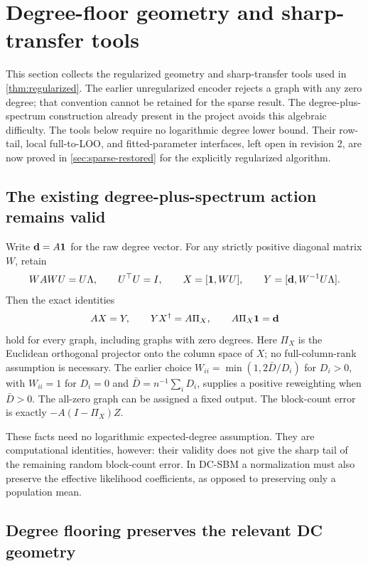 \section{Degree-floor geometry and sharp-transfer tools}
\label{sec:sparse-extension}

This section collects the regularized geometry and sharp-transfer tools
used in \cref{thm:regularized}. The earlier unregularized encoder
rejects a graph with any zero degree; that convention cannot be
retained for the sparse result. The degree-plus-spectrum construction
already present in the project avoids this algebraic difficulty.
The tools below require no logarithmic degree lower bound.
Their row-tail, local full-to-LOO, and fitted-parameter interfaces,
left open in revision 2, are now proved in
\cref{sec:sparse-restored} for the explicitly regularized algorithm.

\subsection{The existing degree-plus-spectrum action remains valid}

Write $\mathbf d=A\mathbf 1$ for the raw degree vector. For any strictly
positive diagonal matrix $W$, retain
\[
 WAWU=U\Lambda,\qquad U^\top U=I,\qquad
 X=[\mathbf 1,WU],\qquad Y=[\mathbf d,W^{-1}U\Lambda].
\]
Then the exact identities
\begin{equation}\label{eq:sparse-old-action}
 AX=Y,\qquad YX^\dagger=A\Pi_X,\qquad A\Pi_X\mathbf 1=\mathbf d
\end{equation}
hold for every graph, including graphs with zero degrees. Here $\Pi_X$
is the Euclidean orthogonal projector onto the column space of $X$;
no full-column-rank assumption is necessary. The earlier choice
$W_{ii}=\min(1,2\bar D/D_i)$ for $D_i>0$, with $W_{ii}=1$ for
$D_i=0$ and $\bar D=n^{-1}\sum_iD_i$, supplies a positive reweighting
when $\bar D>0$. The all-zero graph can be assigned a fixed output.
The block-count error is exactly $-A(I-\Pi_X)Z$.

These facts need no logarithmic expected-degree assumption. They are
computational identities, however: their validity does not give the
sharp tail of the remaining random block-count error. In DC-SBM a
normalization must also preserve the effective likelihood coefficients,
as opposed to preserving only a population mean.

\subsection{Degree flooring preserves the relevant DC geometry}


